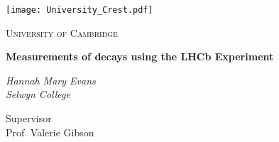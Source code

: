 \begin{titlepage}
  \centering
  \texttt{[image: University\_Crest.pdf]}\par\vspace{1cm}
  {\scshape\LARGE  University of Cambridge \par}
  \vspace{1cm}
  \vspace{1.5cm}
  {\LARGE\bfseries Measurements of  decays using the LHCb Experiment \par}
  \vspace{2cm}
  {\Large\itshape Hannah Mary Evans\\
    Selwyn College\par}
  \vfill
  {\large
  Supervisor  \\
  Prof. Valerie Gibson
  }
  \vfill

  {\large }
\end{titlepage}
